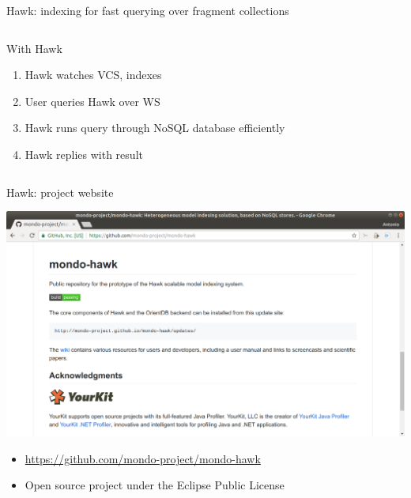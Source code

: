 \documentclass[10pt]{beamer}
\begin{document}
\begin{frame}{Hawk: indexing for fast querying over fragment collections}
\begin{columns}[t]
    \centering
    \begin{block}{With Hawk}
      \begin{enumerate}
      \item Hawk watches VCS, indexes
      \item User queries Hawk over WS
      \item Hawk runs query through NoSQL database efficiently
      \item Hawk replies with result
      \end{enumerate}
    \end{block}

  \end{columns}

\end{frame}

\begin{frame}{Hawk: project website}
  \begin{center}
    \includegraphics[width=\textwidth]{hawk-github}
  \end{center}

  \begin{itemize}
  \item \url{https://github.com/mondo-project/mondo-hawk}
  \item Open source project under the Eclipse Public License
  \end{itemize}
\end{frame}
\end{document}
